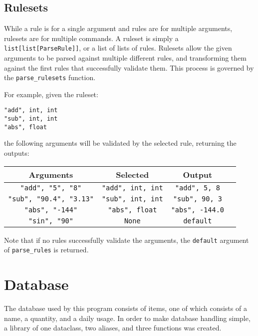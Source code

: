 \documentclass{article}
\begin{document}
		\subsection{Rulesets}
			While a rule is for a single argument and rules are for multiple arguments, rulesets
			are for multiple commands. A ruleset is simply a \verb|list[list[ParseRule]]|, or a
			list of lists of rules. Rulesets allow the given arguments to be parsed against
			multiple different rules, and transforming them against the first rules that
			successfully validate them. This process is governed by the \verb|parse_rulesets|
			function.

			For example, given the ruleset:

			\begin{center}
				\verb|"add", int, int| \\
				\verb|"sub", int, int| \\
				\verb|"abs", float|    \\
			\end{center}

			the following arguments will be validated by the selected rule, returning the outputs:

			\begin{center}
				\begin{tabular}{|c|c|c|c|}
					\hline
					Arguments & Selected & Output
					\\ \hline
						\verb|"add", "5", "8"| &
						\verb|"add", int, int| &
						\verb|"add", 5, 8|
					\\ \hline
						\verb|"sub", "90.4", "3.13"| &
						\verb|"sub", int, int| &
						\verb|"sub", 90, 3|
					\\ \hline
						\verb|"abs", "-144"| &
						\verb|"abs", float| &
						\verb|"abs", -144.0|
					\\ \hline
						\verb|"sin", "90"| &
						\verb|None| &
						\verb|default|
					\\ \hline
				\end{tabular}
			\end{center}

			Note that if no rules successfully validate the arguments, the \verb|default| argument of
			\verb|parse_rules| is returned.

		\pagebreak

	\section{Database}
		The database used by this program consists of items, one of which consists of a name,
		a quantity, and a daily usage. In order to make database handling simple, a library of one
		dataclass, two aliases, and three functions was created.
\end{document}
